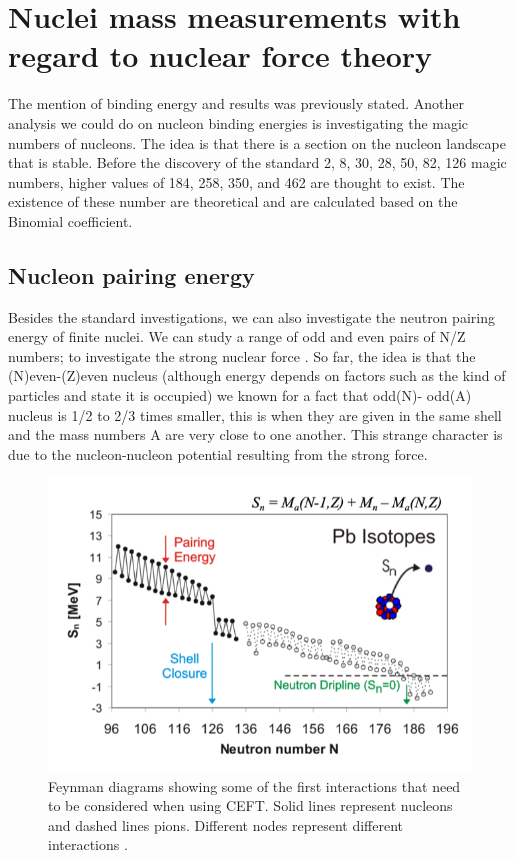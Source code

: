 \section{Nuclei mass measurements with regard to nuclear force theory}
The mention of binding energy and results was previously stated.
Another analysis we could do on nucleon binding energies is investigating the magic numbers of nucleons.
The idea is that there is a section on the nucleon landscape that is stable.
Before the discovery of the standard 2, 8, 30, 28, 50, 82, 126 magic numbers, higher values of 184, 258, 350, and 462 are thought to exist. 
The existence of these number are theoretical and are calculated based on the Binomial coefficient.

\subsection{Nucleon pairing energy}
Besides the standard investigations, we can also investigate the neutron pairing energy of finite nuclei.
We can study a range of odd and even pairs of N/Z numbers; to investigate the strong nuclear force \cite{fred_neutron_2019}.
So far, the idea is that the (N)even-(Z)even nucleus (although energy depends on factors such as the kind of particles and state it is occupied) we known for a fact that odd(N)- odd(A) nucleus is 1/2 to 2/3 times smaller, this is when they are given in the same shell and the mass numbers A are very close to one another.
This strange character is due to the nucleon-nucleon potential resulting from the strong force. \cite{jensen_elementary_1955}

\begin{figure}[H]
    \centering
    \includegraphics[width=.5\textwidth]{images/MSaNFT_zigzag.png}
    \caption{Feynman diagrams showing some of the first interactions that need to be considered when using CEFT. Solid lines represent nucleons and dashed lines pions. Different nodes represent different interactions \cite{machleidt_chiral_2011}.}\label{fig:MSaNFT_zigzag}
\end{figure}


